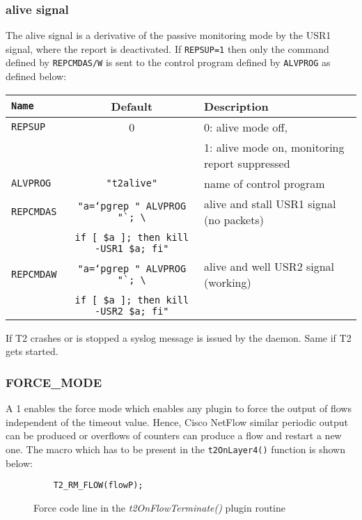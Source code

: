 \subsubsection{alive signal}
The alive signal is a derivative of the passive monitoring mode by the USR1 signal, where the
report is deactivated. If {\tt REPSUP=1} then only the command defined by {\tt REPCMDAS/W} is sent to the
control program defined by {\tt ALVPROG} as defined below:

\begin{longtable}{>{\tt}lcl}
    \toprule
    {\bf Name} & {\bf Default}                                & {\bf Description}\\
    \midrule\endhead%
    REPSUP     & 0                                            & 0: alive mode off,\\
               &                                              & 1: alive mode on, monitoring report suppressed \\
    ALVPROG    & {\tt "t2alive"}                              & name of control program \\
    REPCMDAS   & {\tt "a=`pgrep " ALVPROG "`; \textbackslash} & alive and stall USR1 signal (no packets) \\
               & {\tt if [ \$a ]; then kill -USR1 \$a; fi"}   & \\
    REPCMDAW   & {\tt "a=`pgrep " ALVPROG "`; \textbackslash} & alive and well USR2 signal (working) \\
               & {\tt if [ \$a ]; then kill -USR2 \$a; fi"}   & \\
    \bottomrule
\end{longtable}

If T2 crashes or is stopped a syslog message is issued by the  daemon. Same if T2 gets started.

\subsubsection{FORCE\_MODE}
A 1 enables the force mode which enables any plugin to force the output of flows independent of the timeout value. Hence, Cisco NetFlow
similar periodic output can be produced or overflows of counters can produce a flow and restart a new one. The macro which has to be present
in the {\tt t2OnLayer4()} function is shown below:

\begin{figure}[ht]
\centering
\begin{lstlisting}
    T2_RM_FLOW(flowP);
\end{lstlisting}
\caption{Force code line in the {\em t2OnFlowTerminate()} plugin routine}
\end{figure}

